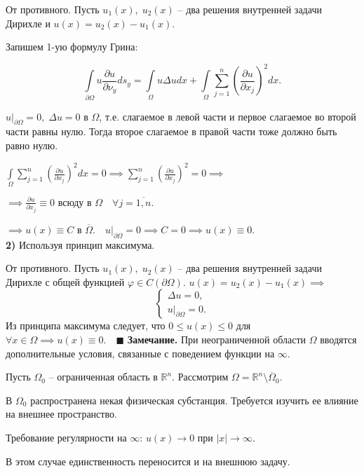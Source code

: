 От противного. Пусть $u_1(x), \; u_2(x)$ -- два решения внутренней задачи Дирихле и $u(x) = u_2(x) - u_1(x)$.

Запишем 1-ую формулу Грина:

$$\int\limits_{\partial \Omega} u \frac{\partial u}{\partial \nu_y} ds_y = \int\limits_\Omega u \Delta u dx + \int\limits_\Omega \sum_{j=1}^n \left (\frac{\partial u}{\partial x_j} \right )^2 dx.$$

$u|_{\partial \Omega} = 0, \; \Delta u = 0$ в $\Omega$, т.е. слагаемое в левой части и первое слагаемое во второй части равны нулю. Тогда второе слагаемое в правой части тоже должно быть равно нулю.

$\int\limits_\Omega \sum_{j=1}^n \left (\frac{\partial u}{\partial x_j} \right )^2 dx = 0 \implies \sum_{j=1}^n \left (\frac{\partial u}{\partial x_j} \right )^2 = 0 \implies$

$\implies \frac{\partial u}{\partial x_j} \equiv 0 \text{ всюду в } \Omega \quad \forall j = \overline{1,n}.$

$\implies u(x) \equiv C$ в $\overline{\Omega}.\quad u|_{\partial \Omega} = 0 \implies C = 0 \implies u(x) \equiv 0$.\\

\textbf{2)} Используя принцип максимума.

От противного. Пусть $u_1(x), \; u_2(x)$ -- два решения внутренней задачи Дирихле с общей функцией $\varphi \in C(\partial \Omega)$. $u(x) = u_2(x) - u_1(x) \implies$
\begin{equation*}
    \begin{cases}
    \Delta u = 0, \\
    u |_{\partial \Omega} = 0.
    \end{cases}
\end{equation*}
Из принципа максимума следует, что $0 \leq u(x) \leq 0$ для $\forall x \in \Omega \implies u(x) \equiv 0. \quad \blacksquare$
\newline \newline
\textbf{Замечание.} При неограниченной области $\Omega$ вводятся дополнительные условия, связанные с поведением функции на $\infty$.

Пусть $\Omega_0$ -- ограниченная область в $\mathbb{R}^n$. Рассмотрим $\Omega = \mathbb{R}^n \setminus \overline{\Omega}_0$.

В $\Omega_0$ распространена некая физическая субстанция. Требуется изучить ее влияние на внешнее пространство.

Требование регулярности на $\infty$: $u(x) \rightarrow 0$ при $|x| \rightarrow \infty$.

В этом случае единственность переносится и на внешнюю задачу.

